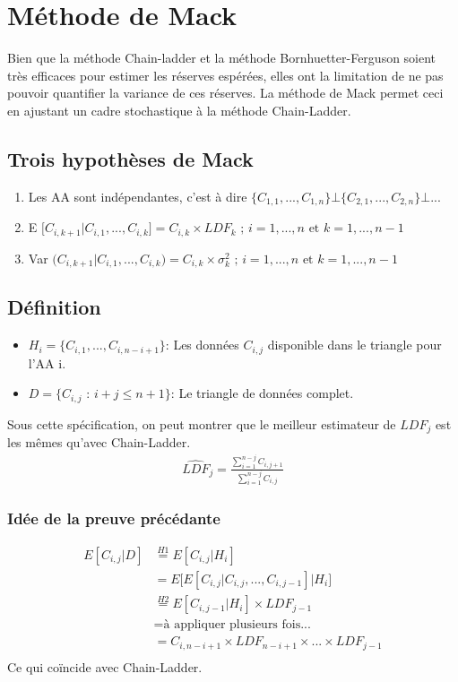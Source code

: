 \section{Méthode de Mack}
Bien que la méthode Chain-ladder et la méthode Bornhuetter-Ferguson soient très efficaces pour estimer les réserves espérées, elles ont la limitation de ne pas pouvoir quantifier la variance de ces réserves. La méthode de Mack permet ceci en ajustant un cadre stochastique à la méthode Chain-Ladder.

\subsection*{Trois hypothèses de Mack}
\begin{enumerate}
\item Les AA sont indépendantes, c'est à dire $\lbrace C_{1,1}, ..., C_{1,n} \rbrace \bot \lbrace C_{2,1}, ..., C_{2,n}\rbrace \bot ... $
\item E $\Big[ C_{i, k+1} | C_{i,1}, ..., C_{i,k}\Big] = C_{i,k} \times LDF_k \text{ ; }i = 1, ..., n \text{ et } k = 1, ..., n-1$ 
\item Var $\Big( C_{i, k+1} | C_{i,1}, ..., C_{i,k}\Big) = C_{i,k} \times \sigma_k^2 \text{ ; }i = 1, ..., n \text{ et } k = 1, ..., n-1$ 
\end{enumerate}

\subsection*{Définition}
\begin{itemize}
\item $H_i = \lbrace C_{i,1}, ..., C_{i,n-i+1} \rbrace$: Les données $C_{i,j}$ disponible dans le triangle pour l'AA i.
\item $D = \lbrace C_{i,j} \text{ : } i+j \leq n + 1 \rbrace$: Le triangle de données complet.
\end{itemize}
Sous cette spécification, on peut montrer que le meilleur estimateur de $LDF_j$ est les mêmes qu'avec Chain-Ladder.
\begin{align*}
\widehat{LDF}_j = \frac{\sum_{i = 1}^{n-j}C_{i,j+1}}{\sum_{i = 1}^{n-j}C_{i,j}}
\end{align*}
\subsubsection*{Idée de la preuve précédante}
\begin{align*}
E[C_{i,j} | D] &\overset{H1}{=} E[C_{i,j}|H_i] \\
&= E\Big[ E[C_{i,j}|C_{i,j},...,C_{i,j-1}] \big| H_i \Big] \\
&\overset{H2}{=} E[C_{i,j-1}|H_i] \times LDF_{j-1} \\
&= \text{à appliquer plusieurs fois...} \\
&=C_{i,n-i+1} \times LDF_{n-i+1} \times ... \times LDF_{j-1} \\
\end{align*}
Ce qui coïncide avec Chain-Ladder.

